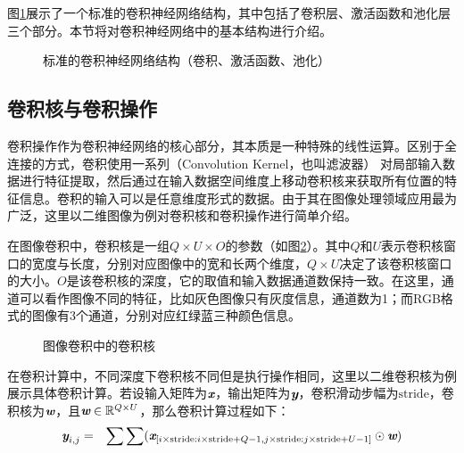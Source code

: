 \parinterval 图\ref{fig:11-2}展示了一个标准的卷积神经网络结构，其中包括了卷积层、激活函数和池化层三个部分。本节将对卷积神经网络中的基本结构进行介绍。

\begin{figure}[htp]
\centering

\caption{标准的卷积神经网络结构（卷积、激活函数、池化）}
\label{fig:11-2}
\end{figure}


\subsection{卷积核与卷积操作}

\parinterval 卷积操作作为卷积神经网络的核心部分，其本质是一种特殊的线性运算。区别于全连接的方式，卷积使用一系列{\small{}}（Convolution Kernel，也叫滤波器） 对局部输入数据进行特征提取，然后通过在输入数据空间维度上移动卷积核来获取所有位置的特征信息。卷积的输入可以是任意维度形式的数据。由于其在图像处理领域应用最为广泛，这里以二维图像为例对卷积核和卷积操作进行简单介绍。

\parinterval 在图像卷积中，卷积核是一组$Q \times U \times O$的参数（如图\ref{fig:11-3}）。其中$Q$和$U$表示卷积核窗口的宽度与长度，分别对应图像中的宽和长两个维度，$Q \times U$决定了该卷积核窗口的大小。$O$是该卷积核的深度，它的取值和输入数据通道数保持一致。在这里，通道可以看作图像不同的特征，比如灰色图像只有灰度信息，通道数为1；而RGB格式的图像有3个通道，分别对应红绿蓝三种颜色信息。

\begin{figure}[htp]
\centering

\caption{图像卷积中的卷积核}
\label{fig:11-3}
\end{figure}

\parinterval 在卷积计算中，不同深度下卷积核不同但是执行操作相同，这里以二维卷积核为例展示具体卷积计算。若设输入矩阵为$\textbf{\em x}$，输出矩阵为$\textbf{\em y}$，卷积滑动步幅为$\textrm{stride}$，卷积核为$\textbf{\em w}$，且$\textbf{\em w} \in \mathbb{R}^{Q \times U} $，那么卷积计算过程如下：
\begin{eqnarray}
\textbf{\em y}_{i,j} &=& \sum \sum ( \textbf{\em x}_{[i\times \textrm{stride}:i\times \textrm{stride}+Q-1,j\times \textrm{stride}:j\times \textrm{stride}+U-1]} \odot \textbf{\em w} )
\label{eq:11-1}
\end{eqnarray}

